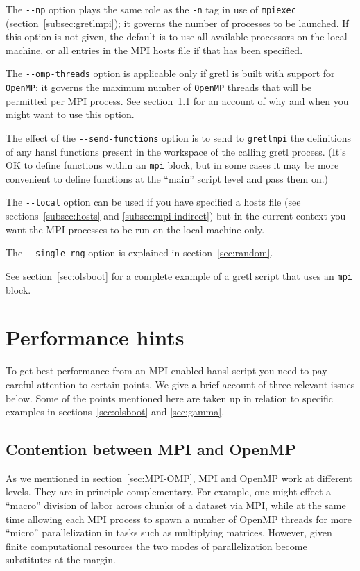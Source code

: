 \documentclass{article}
\begin{document}
The \verb|--np| option plays the same role as the \verb|-n| tag in use
of \texttt{mpiexec} (section~\ref{subsec:gretlmpi}); it governs
the number of processes to be launched. If this option is not given,
the default is to use all available processors on the local machine,
or all entries in the MPI hosts file if that has been specified.

The \verb|--omp-threads| option is applicable only if gretl is built
with support for \texttt{OpenMP}: it governs the maximum number of
\texttt{OpenMP} threads that will be permitted per MPI process.  See
section~\ref{sec:contention} for an account of why and when you might
want to use this option.

The effect of the \verb|--send-functions| option is to send to
\texttt{gretlmpi} the definitions of any hansl functions present
in the workspace of the calling gretl process. (It's OK to define
functions within an \texttt{mpi} block, but in some cases it may be more
convenient to define functions at the ``main'' script level and pass
them on.)

The \verb|--local| option can be used if you have specified a hosts
file (see sections~\ref{subsec:hosts} and \ref{subsec:mpi-indirect})
but in the current context you want the MPI processes to be run on the
local machine only.

The \verb|--single-rng| option is explained in
section~\ref{sec:random}.

\vspace{1ex}

See section~\ref{sec:olsboot} for a complete example of a gretl script
that uses an \texttt{mpi} block.

\section{Performance hints}
\label{sec:performance}

To get best performance from an MPI-enabled hansl script you need to
pay careful attention to certain points. We give a brief account of
three relevant issues below. Some of the points mentioned here are
taken up in relation to specific examples in
sections~\ref{sec:olsboot} and \ref{sec:gamma}.

\subsection{Contention between MPI and OpenMP}
\label{sec:contention}

As we mentioned in section~\ref{sec:MPI-OMP}, MPI and \textsf{OpenMP}
work at different levels. They are in principle complementary. For
example, one might effect a ``macro'' division of labor across chunks
of a dataset via MPI, while at the same time allowing each MPI process
to spawn a number of \textsf{OpenMP} threads for more ``micro''
parallelization in tasks such as multiplying matrices.
However, given finite computational resources the two modes of
parallelization become substitutes at the margin. 
\end{document}
